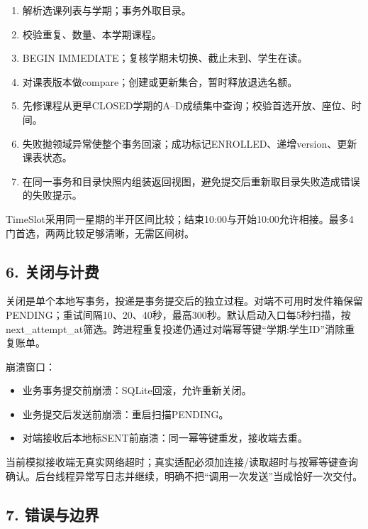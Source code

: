 \documentclass[UTF8,11pt,a4paper]{ctexart}
\providecommand{\tightlist}{\setlength{\itemsep}{0pt}\setlength{\parskip}{0pt}}
\begin{document}
\begin{enumerate}
\def\labelenumi{\arabic{enumi}.}
\tightlist
\item
  解析选课列表与学期；事务外取目录。
\item
  校验重复、数量、本学期课程。
\item
  BEGIN IMMEDIATE；复核学期未切换、截止未到、学生在读。
\item
  对课表版本做compare；创建或更新集合，暂时释放退选名额。
\item
  先修课程从更早CLOSED学期的A--D成绩集中查询；校验首选开放、座位、时间。
\item
  失败抛领域异常使整个事务回滚；成功标记ENROLLED、递增version、更新课表状态。
\item
  在同一事务和目录快照内组装返回视图，避免提交后重新取目录失败造成错误的失败提示。
\end{enumerate}

TimeSlot采用同一星期的半开区间比较；结束10:00与开始10:00允许相接。最多4门首选，两两比较足够清晰，无需区间树。

\hypertarget{6-ux5173ux95edux4e0eux8ba1ux8d39}{%
\subsection{6. 关闭与计费}\label{6-ux5173ux95edux4e0eux8ba1ux8d39}}

关闭是单个本地写事务，投递是事务提交后的独立过程。对端不可用时发件箱保留PENDING；重试间隔10、20、40秒，最高300秒。默认启动入口每5秒扫描，按next\_\allowbreak{}attempt\_\allowbreak{}at筛选。跨进程重复投递仍通过对端幂等键``学期:学生ID''消除重复账单。

崩溃窗口：

\begin{itemize}
\tightlist
\item
  业务事务提交前崩溃：SQLite回滚，允许重新关闭。
\item
  业务提交后发送前崩溃：重启扫描PENDING。
\item
  对端接收后本地标SENT前崩溃：同一幂等键重发，接收端去重。
\end{itemize}

当前模拟接收端无真实网络超时；真实适配必须加连接/读取超时与按幂等键查询确认。后台线程异常写日志并继续，明确不把``调用一次发送''当成恰好一次交付。

\hypertarget{7-ux9519ux8befux4e0eux8fb9ux754c}{%
\subsection{7. 错误与边界}\label{7-ux9519ux8befux4e0eux8fb9ux754c}}
\end{document}
